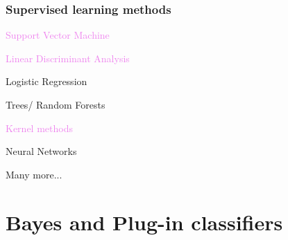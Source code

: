 \documentclass[9pt]{beamer}
\begin{document}
\begin{frame}[allowframebreaks]
\frametitle{Supervised learning methods}


\textcolor{violet}{Support Vector Machine}

\vspace{.2cm}

\textcolor{violet}{Linear Discriminant Analysis}

\vspace{.2cm}

Logistic Regression

\vspace{.2cm}

Trees/ Random Forests

\vspace{.2cm}

\textcolor{violet}{Kernel methods}

\vspace{.2cm}

Neural Networks

\vspace{.2cm}

Many more...


\end{frame}





\section{Bayes and Plug-in classifiers}
\end{document}
